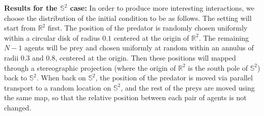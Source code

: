 \documentclass[11pt]{article}
\newcommand{\R}{\mathbb{R}}
\begin{document}
\textbf{Results for the  $\mathbb{S}^2$  case:} In order to produce more interesting interactions, we choose the distribution of the initial condition to be as follows.  The setting will start from $\R^2$ first.  The position of the predator is randomly chosen uniformly within a circular disk of radius $0.1$ centered at the origin of $\R^2$.  The remaining $N - 1$ agents will be prey and chosen uniformly at random within an annulus of radii $0.3$ and $0.8$, centered at the origin.  Then these positions will mapped through a stereographic projection (where the origin of $\R^2$ is the south pole of $\mathbb{S}^2$) back to $\mathbb{S}^2$.  When back on $\mathbb{S}^2$, the position of the predator is moved via parallel transport to a random location on $\mathbb{S}^2$, and the rest of the preys are moved using the same map, so that the relative position between each pair of agents is not changed.
\end{document}
